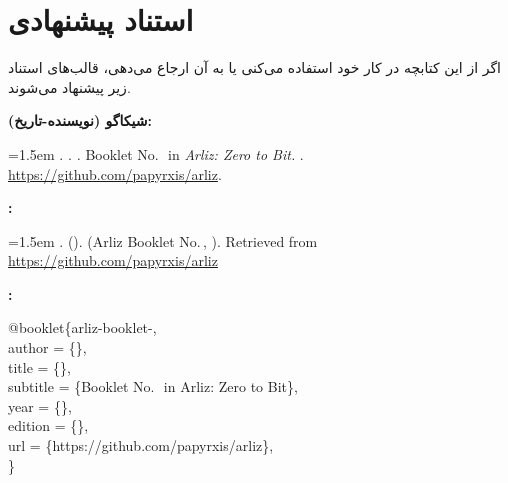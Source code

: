 \chapter*{استناد پیشنهادی}

اگر از این کتابچه در کار خود استفاده می‌کنی یا به آن ارجاع می‌دهی،
قالب‌های استناد زیر پیشنهاد می‌شوند.

\bigskip

\noindent\textbf{شیکاگو (نویسنده-تاریخ):}

\smallskip
\begin{latin}
\noindent\hangindent=1.5em
\BookletAuthor. \BookletYear. \textit{\BookletTitle.}
Booklet No.\,\BookletNumber\ in \textit{Arliz: Zero to Bit.}
\BookletEdition.
\url{https://github.com/papyrxis/arliz}.
\end{latin}

\bigskip

\noindent\textbf{:}

\smallskip
\begin{latin}
\noindent\hangindent=1.5em
\BookletAuthor. (\BookletYear).
\textit{\BookletTitle}
(Arliz Booklet No.\,\BookletNumber, \BookletEdition).
Retrieved from \url{https://github.com/papyrxis/arliz}
\end{latin}

\bigskip

\noindent\textbf{:}

\medskip
\begin{latin}
\begin{tcolorbox}[
  colback=codebackground, colframe=border,
  arc=3pt, boxrule=0.4pt,
  fontupper=\ttfamily\small,
  left=6pt, right=6pt, top=5pt, bottom=5pt
]
@booklet\{arliz-booklet-\BookletNumber,\\
\quad author    = \{\BookletAuthor\},\\
\quad title     = \{\BookletTitle\},\\
\quad subtitle  = \{Booklet No.\,\BookletNumber\ in Arliz: Zero to Bit\},\\
\quad year      = \{\BookletYear\},\\
\quad edition   = \{\BookletEdition\},\\
\quad url       = \{https://github.com/papyrxis/arliz\},\\
\}
\end{tcolorbox}
\end{latin}